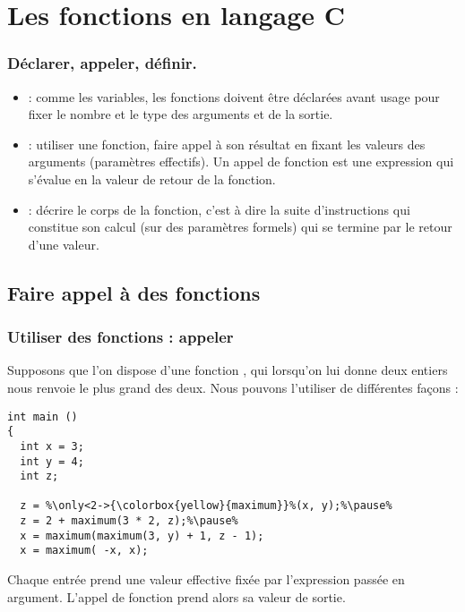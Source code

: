 \documentclass[xcolor=pdftex,svgnames,table]{beamer}
\begin{document}
\section[En C]{Les fonctions en langage C}
\begin{frame}
\frametitle{Déclarer, appeler, définir.}
\pause
\begin{itemize}
\item {} : comme les variables, les fonctions
  doivent être déclarées avant usage pour fixer le nombre et le type
  des arguments et de la sortie.\pause
\item {} : utiliser une fonction, faire appel à son
  résultat en fixant les valeurs des arguments (paramètres
  effectifs). Un appel de fonction est une expression qui s'évalue en la
  valeur de retour de la fonction.\pause
\item {} : décrire le corps de la fonction, c'est à
  dire la suite d'instructions qui constitue son calcul (sur des
  paramètres formels) qui se termine par le retour d'une valeur.
\end{itemize}
\end{frame}

\subsection{Faire appel à des fonctions}
\begin{frame}[fragile]
  \frametitle{Utiliser des fonctions : appeler}

Supposons que l'on dispose d'une fonction , qui lorsqu'on
lui donne deux entiers nous renvoie le plus grand des deux. 
\pause
Nous pouvons l'utiliser de différentes façons :
\begin{lstlisting}[escapechar={\%},basicstyle=\ttfamily\small] 
int main ()
{
  int x = 3;
  int y = 4;
  int z;

  z = %\only<2->{\colorbox{yellow}{maximum}}%(x, y);%\pause%
  z = 2 + maximum(3 * 2, z);%\pause%
  x = maximum(maximum(3, y) + 1, z - 1);
  x = maximum( -x, x);
\end{lstlisting}
\pause
Chaque entrée prend une valeur effective fixée par l'expression passée en
argument. L'appel de fonction prend alors sa valeur de sortie.
\end{frame}
\end{document}
